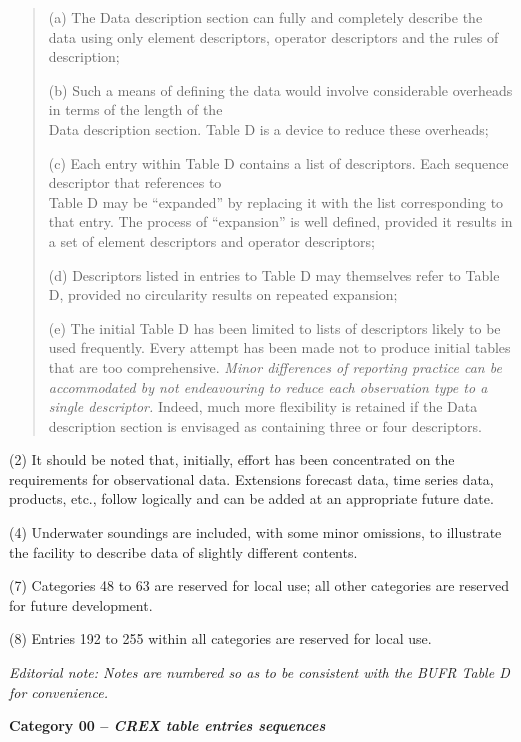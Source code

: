 \begin{quote}
(a) The Data description section can fully and completely describe the data using only element descriptors, operator descriptors and the rules of description;

(b) Such a means of defining the data would involve considerable overheads in terms of the length of the\\
Data description section. Table D is a device to reduce these overheads;

(c) Each entry within Table D contains a list of descriptors. Each sequence descriptor that references to\\
Table D may be ``expanded'' by replacing it with the list corresponding to that entry. The process of ``expansion'' is well defined, provided it results in a set of element descriptors and operator descriptors;

(d) Descriptors listed in entries to Table D may themselves refer to Table D, provided no circularity results on repeated expansion;

(e) The initial Table D has been limited to lists of descriptors likely to be used frequently. Every attempt has been made not to produce initial tables that are too comprehensive. \emph{Minor differences of reporting practice can be accommodated by not endeavouring to reduce each observation type to a single descriptor.} Indeed, much more flexibility is retained if the Data description section is envisaged as containing three or four descriptors.
\end{quote}

(2) It should be noted that, initially, effort has been concentrated on the requirements for observational data. Extensions forecast data, time series data, products, etc., follow logically and can be added at an appropriate future date.

(4) Underwater soundings are included, with some minor omissions, to illustrate the facility to describe data of slightly different contents.

(7) Categories 48 to 63 are reserved for local use; all other categories are reserved for future development.

(8) Entries 192 to 255 within all categories are reserved for local use.

\emph{Editorial note: Notes are numbered so as to be consistent with the BUFR Table D for convenience.}

\textbf{Category 00 -- \emph{CREX table entries sequences}}

